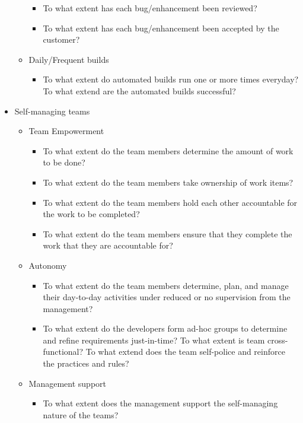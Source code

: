 \begin{appendices}
\begin{itemize}
\begin{itemize}
\begin{itemize}
					\item To what extent has each bug/enhancement been reviewed? 
					\item To what extent has each bug/enhancement been accepted by the customer? 
				\end{itemize}
			\item Daily/Frequent builds
				\begin{itemize}
					\item To what extent do automated builds run one or more times everyday?
					\addition To what extend are the automated builds successful?
				\end{itemize}
		\end{itemize}

	\item Self-managing teams
		\begin{itemize}
			\item Team Empowerment
				\begin{itemize}
					\item To what extent do the team members determine the amount of work to be done? 
					\item To what extent do the team members take ownership of work items? 
					\item To what extent do the team members hold each other accountable for the work to be completed? 
					\item To what extent do the team members ensure that they complete the work that they are accountable for?
				\end{itemize}
			\item Autonomy
				\begin{itemize}
					\item To what extent do the team members determine, plan, and manage their day-to-day activities under reduced or no supervision from the management? 
					\item To what extent do the developers form ad-hoc groups to determine and refine requirements just-in-time?
					\addition To what extent is team cross-functional? 
					\addition To what extend does the team self-police and reinforce the practices and rules?
				\end{itemize}
			\item Management support
				\begin{itemize}
					\item To what extent does the management support the self-managing nature of the teams?

\end{itemize}
\end{itemize}
\end{itemize}
\end{appendices}
